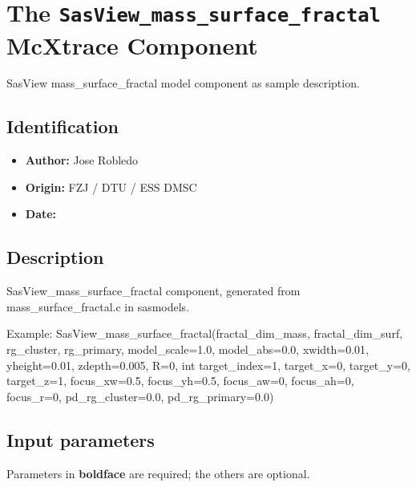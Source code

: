 \section{The \texttt{SasView\_mass\_surface\_fractal} McXtrace Component}
SasView mass\_surface\_fractal model component as sample description.

\subsection*{Identification}
\begin{itemize}
  \item \textbf{Author:} Jose Robledo
  \item \textbf{Origin:} FZJ / DTU / ESS DMSC
  \item \textbf{Date:} 
\end{itemize}

\subsection*{Description}
SasView\_mass\_surface\_fractal component, generated from mass\_surface\_fractal.c in sasmodels.

Example: SasView\_mass\_surface\_fractal(fractal\_dim\_mass, fractal\_dim\_surf, rg\_cluster, rg\_primary, model\_scale=1.0, model\_abs=0.0, xwidth=0.01, yheight=0.01, zdepth=0.005, R=0, int target\_index=1, target\_x=0, target\_y=0, target\_z=1, focus\_xw=0.5, focus\_yh=0.5, focus\_aw=0, focus\_ah=0, focus\_r=0, pd\_rg\_cluster=0.0, pd\_rg\_primary=0.0)

\subsection*{Input parameters}
Parameters in \textbf{boldface} are required; the others are optional.

